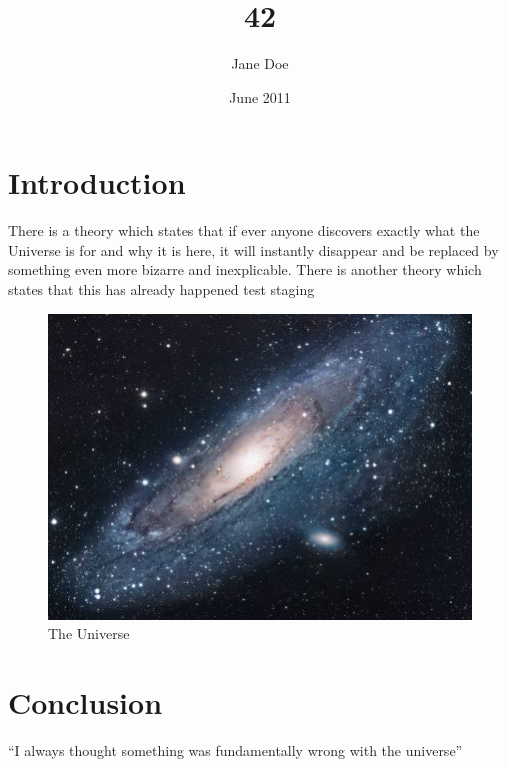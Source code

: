 \documentclass{article}
\title{42}
\author{Jane Doe}
\date{June 2011}
\begin{document}
\maketitle

\section{Introduction}
There is a theory which states that if ever anyone discovers exactly what
 the Universe is for and why it is here, 
it will instantly disappear and be replaced by something even more bizarre 
and inexplicable.
There is another theory which states that this has already happened
test
staging
\begin{figure}[h!]
\centering
\includegraphics[scale=1.7]{universe.jpg}
\caption{The Universe}
\label{threadsVsSync}
\end{figure}

\section{Conclusion}
``I always thought something was fundamentally wrong with the universe'' \citep{adams1995hitchhiker}



\end{document}
